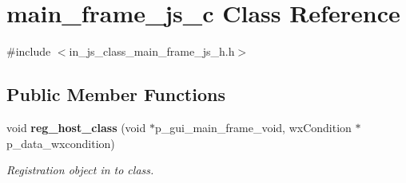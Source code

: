 \section{main\+\_\+frame\+\_\+js\+\_\+c Class Reference}
\label{classmain__frame__js__c}


{\ttfamily \#include $<$in\+\_\+js\+\_\+class\+\_\+main\+\_\+frame\+\_\+js\+\_\+h.\+h$>$}

\subsection*{Public Member Functions}
\begin{DoxyCompactItemize}
\item 
void \textbf{ reg\+\_\+host\+\_\+class} (void $\ast$p\+\_\+gui\+\_\+main\+\_\+frame\+\_\+void, wx\+Condition $\ast$p\+\_\+data\+\_\+wxcondition)
\begin{DoxyCompactList}\small\item\em Registration object in to class. \end{DoxyCompactList}\end{DoxyCompactItemize}
